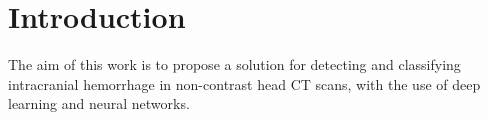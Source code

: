 \chapter{Introduction}

The aim of this work is to propose a solution for detecting and classifying intracranial hemorrhage in non-contrast head CT scans, with the use of deep learning and neural networks.

